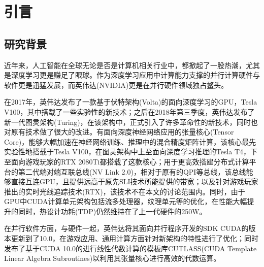 \newpage
\section{引言}
\setcounter{table}{0}
\setcounter{figure}{0}
\subsection{研究背景}
\par 近年来，人工智能在全球无论是否是计算机相关行业中，都掀起了一股热潮，尤其是深度学习更是赚足了眼球。作为深度学习应用中计算能力支撑的并行计算硬件与软件更是迅猛发展，而英伟达(NVIDIA)更是在并行硬件领域独占鳌头。
\par 在2017年，英伟达发布了一款基于伏特架构(Volta)的面向深度学习的GPU，Tesla V100\parencite{TESLAV100}，其中搭载了一些实验性的新技术；之后在2018年第三季度，英伟达发布了新一代图灵架构(Turing)，在该架构中，正式引入了许多革命性的新技术，同时也对原有技术做了很大的改进。有面向深度神经网络应用的张量核心(Tensor Core)\parencite{TENSORCORE}，能够大幅加速在神经网络训练、推理中的混合精度矩阵计算，该核心最先实验性地搭载于Tesla V100，在图灵架构中上至面向深度学习推理的Tesla T4，下至面向游戏玩家的RTX 2080Ti都搭载了这款核心；用于更高效搭建分布式计算平台的第二代端对端互联总线(NV Link 2.0)\parencite{NVLINK2}，相对于原有的QPI等总线，该总线能够直接互连GPU，且提供远高于原先SLI技术所能提供的带宽；以及针对游戏玩家推出的实时光线追踪技术(RTX)，该技术不在本文的讨论范围内。同时，由于GPU中CUDA计算单元架构包括流多处理器，纹理单元等的优化，在性能大幅提升的同时，热设计功耗(TDP)仍然维持在了上一代硬件的250W。
\par 在并行软件方面，与硬件一起，英伟达将其面向并行程序开发的SDK CUDA的版本更新到了10.0，在游戏应用、通用计算方面针对新架构的特性进行了优化；同时发布了基于CUDA 10.0的进行线性代数计算的模板库CUTLASS(CUDA Template Linear Algebra Subroutines)\parencite{CUTLASS}以利用其张量核心进行高效的代数运算。

